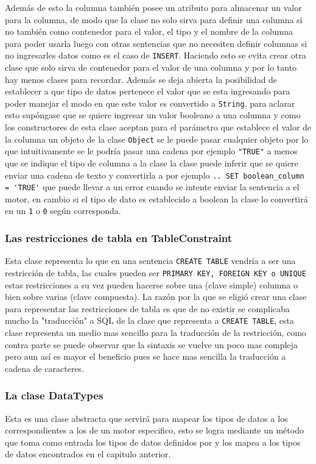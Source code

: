 Además de esto la columna también posee un atributo para almacenar un valor para la columna, de modo que la clase no solo sirva para definir una columna si no también como contenedor para el valor, el tipo y el nombre  de la columna para poder usarla luego con otras sentencias que no necesiten definir columnas si no ingresarles datos como es el caso de \verb=INSERT=. Haciendo esto se evita crear otra clase que solo sirva de contenedor para el valor de una columna y por lo tanto hay menos clases para recordar. Además se deja abierta la posibilidad de establecer a que tipo de datos pertenece el valor que se esta ingresando para poder manejar el modo en que este valor es convertido a \verb=String=, para aclarar esto supóngase que se quiere ingresar un valor booleano a una columna y como los constructores de esta clase aceptan para el parámetro que establece el valor de la columna un objeto de la clase \verb=Object= se le puede pasar cualquier objeto por lo que intuitivamente se le podría pasar una cadena  por ejemplo \verb|"TRUE"| a menos que se indique el tipo de columna a la clase la clase puede inferir que se quiere enviar una cadena de texto y convertirla a  por ejemplo \verb|.. SET boolean_column = 'TRUE'| que puede llevar a un error cuando se intente enviar la sentencia a el motor, en cambio si el tipo de dato es establecido a boolean la clase lo convertirá en un \verb=1= o \verb=0= según corresponda.
%
\subsubsection{Las restricciones de tabla en TableConstraint}
Esta clase representa lo que en una sentencia \verb=CREATE TABLE= vendría a ser una restricción de tabla, las cuales pueden ser \verb=PRIMARY KEY, FOREIGN KEY o UNIQUE= estas restricciones a su vez pueden hacerse sobre una (clave simple) columna o bien sobre varias (clave compuesta). La razón por la que se eligió crear una clase para representar las restricciones de tabla es que de no existir se complicaba mucho la "traducción" a SQL de la clase que representa a \verb=CREATE TABLE=, esta clase representa un medio mas sencillo para la traducción de la restricción, como contra parte se puede observar que la sintaxis se vuelve un poco mas compleja pero aun así es mayor el beneficio pues se hace mas sencilla la traducción a cadena de caracteres. 
%
\subsubsection{La clase DataTypes}
Esta es una clase abstracta que servirá para mapear los tipos de datos a los correspondientes a los de un motor especifico, esto se logra mediante un método que toma como entrada los tipos de datos definidos por \jd y los mapea a los tipos de datos encontrados en el capitulo anterior.
%
